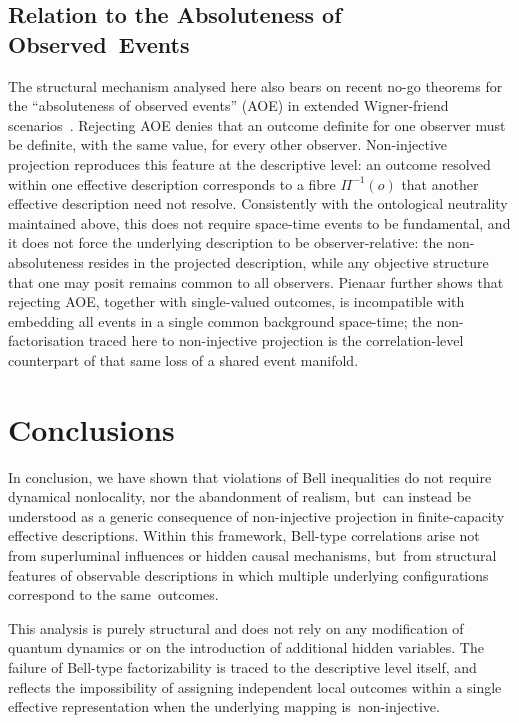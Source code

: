 \documentclass[quantumrep,article,accept,pdftex,oneauthor]{Definitions/mdpi}
\theoremstyle{remark}
\begin{document}
  \subsection{Relation to the Absoluteness of Observed~Events}
    The structural mechanism analysed here also bears on recent no-go theorems for the
    ``absoluteness of observed events'' (AOE) in extended Wigner-friend scenarios~\cite{Pienaar2026}.
    Rejecting AOE denies that an outcome definite for one observer must be definite, with the same value,
    for every other observer.
    Non-injective projection reproduces this feature at the descriptive level: an outcome resolved within
    one effective description corresponds to a fibre $\Pi^{-1}(o)$ that another effective description need
    not resolve.
    Consistently with the ontological neutrality maintained above, this does not require space-time events
    to be fundamental, and it does not force the underlying description to be observer-relative: the
    non-absoluteness resides in the projected description, while any objective structure that one may posit
    remains common to all observers.
    Pienaar further shows that rejecting AOE, together with single-valued outcomes, is incompatible with
    embedding all events in a single common background space-time; the non-factorisation traced here to
    non-injective projection is the correlation-level counterpart of that same loss of a shared event
    manifold.

  \section{Conclusions}
  \label{sec:conclusion}

  In conclusion, we have shown that violations of Bell inequalities do not require
  dynamical nonlocality, nor the abandonment of realism, but~can instead be understood
  as a generic consequence of non-injective projection in finite-capacity effective
  descriptions.
  Within this framework, Bell-type correlations arise not from superluminal influences
  or hidden causal mechanisms, but~from structural features of observable descriptions
  in which multiple underlying configurations correspond to the same~outcomes.

  This analysis is purely structural and does not rely on any modification of quantum
  dynamics or on the introduction of additional hidden variables.
  The failure of Bell-type factorizability is traced to the descriptive level itself,
  and reflects the impossibility of assigning independent local outcomes within a
  single effective representation when the underlying mapping is~non-injective.
\end{document}

